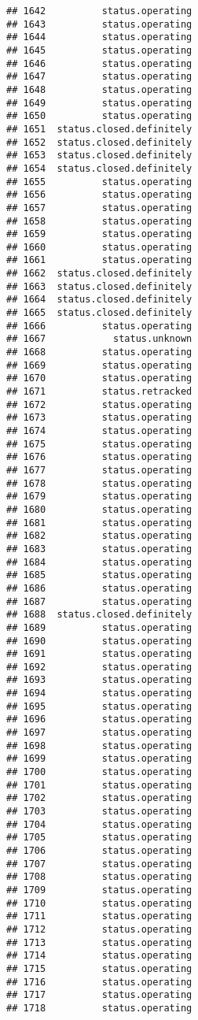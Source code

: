 \documentclass[
]{article}
\begin{document}
\begin{verbatim}
## 1642          status.operating
## 1643          status.operating
## 1644          status.operating
## 1645          status.operating
## 1646          status.operating
## 1647          status.operating
## 1648          status.operating
## 1649          status.operating
## 1650          status.operating
## 1651  status.closed.definitely
## 1652  status.closed.definitely
## 1653  status.closed.definitely
## 1654  status.closed.definitely
## 1655          status.operating
## 1656          status.operating
## 1657          status.operating
## 1658          status.operating
## 1659          status.operating
## 1660          status.operating
## 1661          status.operating
## 1662  status.closed.definitely
## 1663  status.closed.definitely
## 1664  status.closed.definitely
## 1665  status.closed.definitely
## 1666          status.operating
## 1667            status.unknown
## 1668          status.operating
## 1669          status.operating
## 1670          status.operating
## 1671          status.retracked
## 1672          status.operating
## 1673          status.operating
## 1674          status.operating
## 1675          status.operating
## 1676          status.operating
## 1677          status.operating
## 1678          status.operating
## 1679          status.operating
## 1680          status.operating
## 1681          status.operating
## 1682          status.operating
## 1683          status.operating
## 1684          status.operating
## 1685          status.operating
## 1686          status.operating
## 1687          status.operating
## 1688  status.closed.definitely
## 1689          status.operating
## 1690          status.operating
## 1691          status.operating
## 1692          status.operating
## 1693          status.operating
## 1694          status.operating
## 1695          status.operating
## 1696          status.operating
## 1697          status.operating
## 1698          status.operating
## 1699          status.operating
## 1700          status.operating
## 1701          status.operating
## 1702          status.operating
## 1703          status.operating
## 1704          status.operating
## 1705          status.operating
## 1706          status.operating
## 1707          status.operating
## 1708          status.operating
## 1709          status.operating
## 1710          status.operating
## 1711          status.operating
## 1712          status.operating
## 1713          status.operating
## 1714          status.operating
## 1715          status.operating
## 1716          status.operating
## 1717          status.operating
## 1718          status.operating

\end{verbatim}
\end{document}
